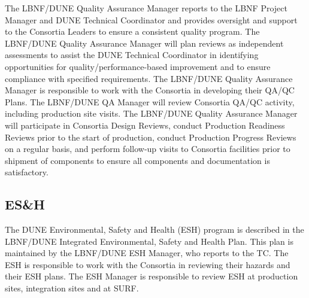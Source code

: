 The LBNF/DUNE Quality Assurance Manager reports to the LBNF Project
Manager and DUNE Technical Coordinator and provides oversight and
support to the Consortia Leaders to ensure a consistent quality
program. The LBNF/DUNE Quality Assurance Manager will plan reviews as
independent assessments to assist the DUNE Technical Coordinator in
identifying opportunities for quality/performance-based improvement
and to ensure compliance with specified requirements. The LBNF/DUNE
Quality Assurance Manager is responsible to work with the Consortia in
developing their QA/QC Plans. The LBNF/DUNE QA Manager will review
Consortia QA/QC activity, including production site visits.  The
LBNF/DUNE Quality Assurance Manager will participate in Consortia
Design Reviews, conduct Production Readiness Reviews prior to the
start of production, conduct Production Progress Reviews on a regular
basis, and perform follow-up visits to Consortia facilities prior to
shipment of components to ensure all components and documentation is
satisfactory.


\subsection{ES\&H}
\label{sec:fdsp-coord-esh}

The DUNE Environmental, Safety and Health (ESH) program is described
in the LBNF/DUNE Integrated Environmental, Safety and Health
Plan. This plan is maintained by the LBNF/DUNE ESH Manager, who
reports to the TC. The ESH is responsible to work with the Consortia
in reviewing their hazards and their ESH plans.  The ESH Manager is
responsible to review ESH at production sites, integration sites and
at SURF.



